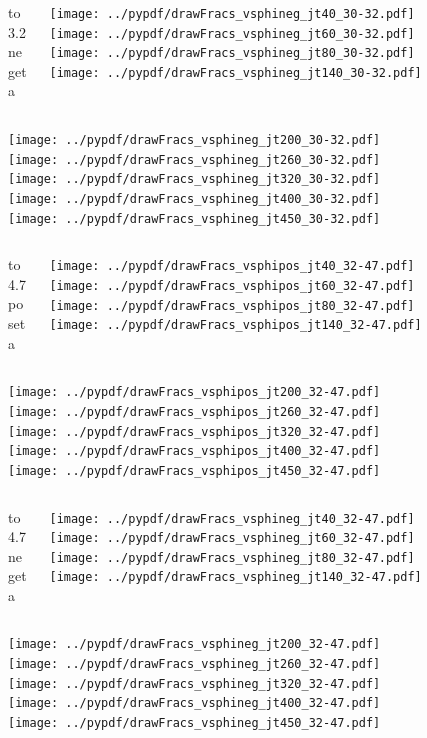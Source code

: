 \documentclass[aspectratio=169]{beamer}
\begin{document}
\begin{figure}[p]
\flushleft
\begin{columns}[T]
\begin{column}{.2\linewidth}
 to 3.2 negeta
\end{column}
\begin{column}{.8\linewidth}
\texttt{[image: ../pypdf/drawFracs\_vsphineg\_jt40\_30-32.pdf]}
\texttt{[image: ../pypdf/drawFracs\_vsphineg\_jt60\_30-32.pdf]}
\texttt{[image: ../pypdf/drawFracs\_vsphineg\_jt80\_30-32.pdf]}
\texttt{[image: ../pypdf/drawFracs\_vsphineg\_jt140\_30-32.pdf]}
\end{column}
\end{columns}
\texttt{[image: ../pypdf/drawFracs\_vsphineg\_jt200\_30-32.pdf]}
\texttt{[image: ../pypdf/drawFracs\_vsphineg\_jt260\_30-32.pdf]}
\texttt{[image: ../pypdf/drawFracs\_vsphineg\_jt320\_30-32.pdf]}
\texttt{[image: ../pypdf/drawFracs\_vsphineg\_jt400\_30-32.pdf]}
\texttt{[image: ../pypdf/drawFracs\_vsphineg\_jt450\_30-32.pdf]}
\end{figure}

\begin{figure}[p]
\flushleft
\begin{columns}[T]
\begin{column}{.2\linewidth}
 to 4.7 poseta
\end{column}
\begin{column}{.8\linewidth}
\texttt{[image: ../pypdf/drawFracs\_vsphipos\_jt40\_32-47.pdf]}
\texttt{[image: ../pypdf/drawFracs\_vsphipos\_jt60\_32-47.pdf]}
\texttt{[image: ../pypdf/drawFracs\_vsphipos\_jt80\_32-47.pdf]}
\texttt{[image: ../pypdf/drawFracs\_vsphipos\_jt140\_32-47.pdf]}
\end{column}
\end{columns}
\texttt{[image: ../pypdf/drawFracs\_vsphipos\_jt200\_32-47.pdf]}
\texttt{[image: ../pypdf/drawFracs\_vsphipos\_jt260\_32-47.pdf]}
\texttt{[image: ../pypdf/drawFracs\_vsphipos\_jt320\_32-47.pdf]}
\texttt{[image: ../pypdf/drawFracs\_vsphipos\_jt400\_32-47.pdf]}
\texttt{[image: ../pypdf/drawFracs\_vsphipos\_jt450\_32-47.pdf]}
\end{figure}

\begin{figure}[p]
\flushleft
\begin{columns}[T]
\begin{column}{.2\linewidth}
 to 4.7 negeta
\end{column}
\begin{column}{.8\linewidth}
\texttt{[image: ../pypdf/drawFracs\_vsphineg\_jt40\_32-47.pdf]}
\texttt{[image: ../pypdf/drawFracs\_vsphineg\_jt60\_32-47.pdf]}
\texttt{[image: ../pypdf/drawFracs\_vsphineg\_jt80\_32-47.pdf]}
\texttt{[image: ../pypdf/drawFracs\_vsphineg\_jt140\_32-47.pdf]}
\end{column}
\end{columns}
\texttt{[image: ../pypdf/drawFracs\_vsphineg\_jt200\_32-47.pdf]}
\texttt{[image: ../pypdf/drawFracs\_vsphineg\_jt260\_32-47.pdf]}
\texttt{[image: ../pypdf/drawFracs\_vsphineg\_jt320\_32-47.pdf]}
\texttt{[image: ../pypdf/drawFracs\_vsphineg\_jt400\_32-47.pdf]}
\texttt{[image: ../pypdf/drawFracs\_vsphineg\_jt450\_32-47.pdf]}
\end{figure}
\end{document}
